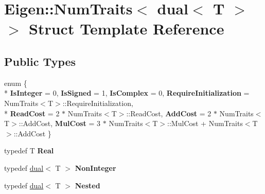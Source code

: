 \hypertarget{struct_eigen_1_1_num_traits_3_01dual_3_01_t_01_4_01_4}{\section{Eigen\-:\-:Num\-Traits$<$ dual$<$ T $>$ $>$ Struct Template Reference}
\label{struct_eigen_1_1_num_traits_3_01dual_3_01_t_01_4_01_4}
}
\subsection*{Public Types}
\begin{DoxyCompactItemize}
\item 
enum \{ \\*
{\bfseries Is\-Integer} = 0, 
{\bfseries Is\-Signed} = 1, 
{\bfseries Is\-Complex} = 0, 
{\bfseries Require\-Initialization} = Num\-Traits$<$T$>$\-:\-:Require\-Initialization, 
\\*
{\bfseries Read\-Cost} = 2 $\ast$ Num\-Traits$<$T$>$\-:\-:Read\-Cost, 
{\bfseries Add\-Cost} = 2 $\ast$ Num\-Traits$<$T$>$\-:\-:Add\-Cost, 
{\bfseries Mul\-Cost} = 3 $\ast$ Num\-Traits$<$T$>$\-:\-:Mul\-Cost + Num\-Traits$<$T$>$\-:\-:Add\-Cost
 \}
\item 
\hypertarget{struct_eigen_1_1_num_traits_3_01dual_3_01_t_01_4_01_4_a1104f56db31039ea4f10cbb93c399225}{typedef T {\bfseries Real}}\label{struct_eigen_1_1_num_traits_3_01dual_3_01_t_01_4_01_4_a1104f56db31039ea4f10cbb93c399225}

\item 
\hypertarget{struct_eigen_1_1_num_traits_3_01dual_3_01_t_01_4_01_4_aeac6a4fe1a0dfd09a45b1f91c9b238b1}{typedef \hyperlink{struct_d_r_d_s_p_1_1dual}{dual}$<$ T $>$ {\bfseries Non\-Integer}}\label{struct_eigen_1_1_num_traits_3_01dual_3_01_t_01_4_01_4_aeac6a4fe1a0dfd09a45b1f91c9b238b1}

\item 
\hypertarget{struct_eigen_1_1_num_traits_3_01dual_3_01_t_01_4_01_4_a7567273cf33aec5adf9c0ebf97e0de60}{typedef \hyperlink{struct_d_r_d_s_p_1_1dual}{dual}$<$ T $>$ {\bfseries Nested}}\label{struct_eigen_1_1_num_traits_3_01dual_3_01_t_01_4_01_4_a7567273cf33aec5adf9c0ebf97e0de60}

\end{DoxyCompactItemize}
